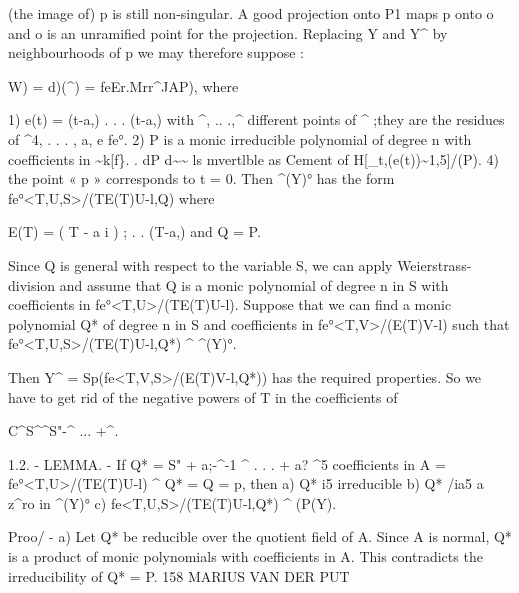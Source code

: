 \documentclass[
  10pt,
]{article}
\newenvironment{Shaded}{}{}
\newcommand{\NormalTok}[1]{#1}
\begin{document}
\begin{Shaded}
\begin{Highlighting}[]
\NormalTok{ (the image of) p is still non{-}singular. A good projection onto P1 maps p}
\NormalTok{ onto o and o is an unramified point for the projection. Replacing Y and}
\NormalTok{ Y\^{} by neighbourhoods of p we may therefore suppose :}

\NormalTok{                     W) = d)(\^{}) = feEr.Mrr\^{}JAP),}
\NormalTok{ where}

\NormalTok{     1) e(t) = (t{-}a,) . . . (t{-}a,) with \^{}, .. .,\^{} different points of \^{} ;they}
\NormalTok{ are the residues of \^{}4, . . . , a, e fe°.}
\NormalTok{     2) P is a monic irreducible polynomial of degree n with coefficients in}
\NormalTok{ \textasciitilde{}k[f\}.}
\NormalTok{    . dP}
\NormalTok{     \textquotesingle{} d\textasciitilde{}\textasciitilde{} ls mvertlble as Cement of H[\_t,(e(t))\textasciitilde{}1,5]/(P).}
\NormalTok{    4) the point « p » corresponds to t = 0.}
\NormalTok{ Then \^{}(Y)° has the form fe°\textless{}T,U,S\textgreater{}/(TE(T)U{-}l,Q) where}

\NormalTok{              E(T) = ( T {-} a i ) ; . . (T{-}a,)   and     Q = P.}

\NormalTok{Since Q is general with respect to the variable S, we can apply Weierstrass{-}}
\NormalTok{division and assume that Q is a monic polynomial of degree n in S with}
\NormalTok{coefficients in fe°\textless{}T,U\textgreater{}/(TE(T)U{-}l). Suppose that we can find a monic}
\NormalTok{polynomial Q* of degree n in S and coefficients in fe°\textless{}T,V\textgreater{}/(E(T)V{-}l)}
\NormalTok{such that}
\NormalTok{                   fe°\textless{}T,U,S\textgreater{}/(TE(T)U{-}l,Q*) \^{} \^{}(Y)°.}

\NormalTok{Then Y\^{} = Sp(fe\textless{}T,V,S\textgreater{}/(E(T)V{-}l,Q*)) has the required properties. So we}
\NormalTok{have to get rid of the negative powers of T in the coefficients of}

\NormalTok{                    C\^{}S\^{}\^{}S"{-}\^{} ... +\^{}.}


\NormalTok{    1.2. {-} LEMMA. {-} If Q* = S" + a;{-}\^{}{-}1 \^{} . . . + a? \^{}5}
\NormalTok{coefficients in A = fe°\textless{}T,U\textgreater{}/(TE(T)U{-}l) \^{} Q* = Q = p, then}
\NormalTok{   a) Q* i5 irreducible}
\NormalTok{   b) Q* /ia5 a z\^{}ro in \^{}(Y)°}
\NormalTok{   c) fe\textless{}T,U,S\textgreater{}/(TE(T)U{-}l,Q*) \^{} (P(Y).}

\NormalTok{    Proo/ {-} a) Let Q* be reducible over the quotient field of A.}
\NormalTok{Since A is normal, Q* is a product of monic polynomials with}
\NormalTok{coefficients in A. This contradicts the irreducibility of Q* = P.}
\NormalTok{158                       MARIUS VAN DER PUT}



\end{Highlighting}
\end{Shaded}
\end{document}
